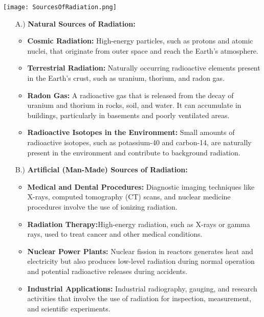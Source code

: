 \documentclass[../introduction.tex]{subfiles}
\begin{document}
        \begin{Figure}
            \centering
            \texttt{[image: SourcesOfRadiation.png]}
            \label{fig:SourcesOfRadiation}
        \end{Figure}

        \begin{enumerate}
            \item[A.)] \textbf{Natural Sources of Radiation:}
            \begin{itemize}
                \item \textbf{Cosmic Radiation:} High-energy particles, such as protons and atomic nuclei, that originate from outer space 
                and reach the Earth's atmosphere.

                \item \textbf{Terrestrial Radiation:} Naturally occurring radioactive elements present in the Earth's crust, such as uranium, 
                thorium, and radon gas.

                \item \textbf{Radon Gas:} A radioactive gas that is released from the decay of uranium and thorium in rocks, soil, 
                and water. It can accumulate in buildings, particularly in basements and poorly ventilated areas.

                \item \textbf{Radioactive Isotopes in the Environment:} Small amounts of radioactive isotopes, 
                such as potassium-40 and carbon-14, are naturally present in the environment and contribute to background radiation.

            \end{itemize} 

            \item[B.)] \textbf{Artificial (Man-Made) Sources of Radiation:}
            \begin{itemize}
                \item \textbf{Medical and Dental Procedures:} Diagnostic imaging techniques 
                like X-rays, computed tomography (CT) scans, and nuclear medicine procedures involve the use of ionizing radiation.

                \item \textbf{Radiation Therapy:}High-energy radiation, such as X-rays or gamma rays, used to treat cancer and other medical conditions.

                \item \textbf{Nuclear Power Plants:} Nuclear fission in reactors generates heat and electricity but also produces low-level radiation 
                during normal operation and potential radioactive releases during accidents.

                \item \textbf{Industrial Applications:} Industrial radiography, gauging, and research activities that involve the use of radiation 
                for inspection, measurement, and scientific experiments.
            \end{itemize}
        \end{enumerate}
\end{document}

